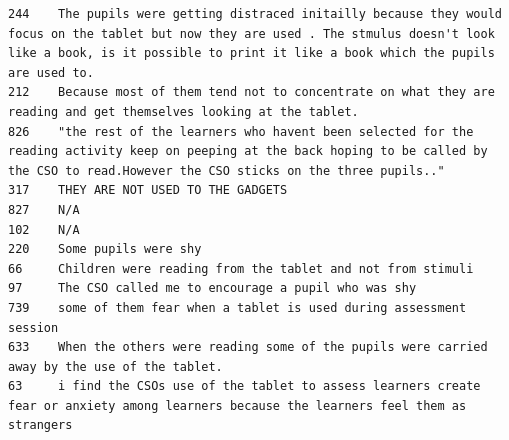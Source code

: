 \documentclass[11pt]{article}
\begin{document}
    \begin{Verbatim}[commandchars=\\\{\}]
244    The pupils were getting distraced initailly because they would focus on the tablet but now they are used . The stmulus doesn't look like a book, is it possible to print it like a book which the pupils are used to.
212    Because most of them tend not to concentrate on what they are reading and get themselves looking at the tablet.                                                                                                      
826    "the rest of the learners who havent been selected for the reading activity keep on peeping at the back hoping to be called by the CSO to read.However the CSO sticks on the three pupils.."                         
317    THEY ARE NOT USED TO THE GADGETS                                                                                                                                                                                     
827    N/A                                                                                                                                                                                                                  
102    N/A                                                                                                                                                                                                                  
220    Some pupils were shy                                                                                                                                                                                                 
66     Children were reading from the tablet and not from stimuli                                                                                                                                                           
97     The CSO called me to encourage a pupil who was shy                                                                                                                                                                   
739    some of them fear when a tablet is used during assessment session                                                                                                                                                    
633    When the others were reading some of the pupils were carried away by the use of the tablet.                                                                                                                          
63     i find the CSOs use of the tablet to assess learners create fear or anxiety among learners because the learners feel them as strangers                                                                               

\end{Verbatim}
\end{document}

